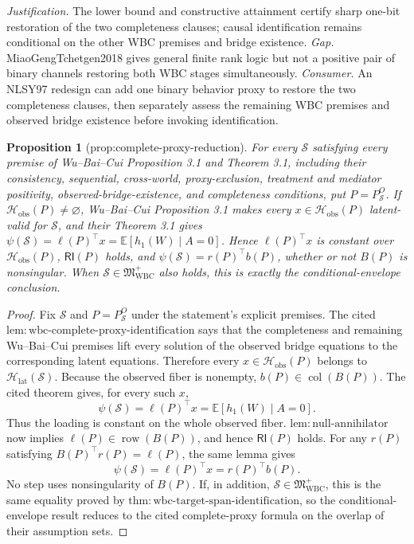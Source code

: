 \documentclass{article}
\newtheorem{proposition}{Proposition}
\begin{document}
\par\smallskip\noindent \textit{Justification.} The lower bound and constructive attainment certify sharp one-bit restoration of the two completeness clauses; causal identification remains conditional on the other WBC premises and bridge existence. \textit{Gap.} MiaoGengTchetgen2018 gives general finite rank logic but not a positive pair of binary channels restoring both WBC stages simultaneously. \textit{Consumer.} An NLSY97 redesign can add one binary behavior proxy to restore the two completeness clauses, then separately assess the remaining WBC premises and observed bridge existence before invoking identification.

\begin{proposition}[prop:complete-proxy-reduction]\label{prop:complete-proxy-reduction}
For every \(\mathcal S\) satisfying every premise of Wu--Bai--Cui Proposition 3.1 and Theorem 3.1, including their consistency, sequential, cross-world, proxy-exclusion, treatment and mediator positivity, observed-bridge-existence, and completeness conditions, put \(P=P_{\mathcal S}^O\). If \(\mathcal H_{\mathrm{obs}}(P)\neq\varnothing\), Wu--Bai--Cui Proposition 3.1 makes every \(x\in\mathcal H_{\mathrm{obs}}(P)\) latent-valid for \(\mathcal S\), and their Theorem 3.1 gives \(\psi(\mathcal S)=\ell(P)^{\top}x=\mathbb E[h_1(W)\mid A=0]\). Hence \(\ell(P)^{\top}x\) is constant over \(\mathcal H_{\mathrm{obs}}(P)\), \(\mathsf{RI}(P)\) holds, and \(\psi(\mathcal S)=r(P)^{\top}b(P)\), whether or not \(B(P)\) is nonsingular. When \(\mathcal S\in\mathfrak M_{\mathrm{WBC}}^{+}\) also holds, this is exactly the conditional-envelope conclusion.
\end{proposition}
\begin{proof}
Fix \(\mathcal S\) and \(P=P_{\mathcal S}^O\) under the statement's
explicit premises.  The cited
\(\mathrm{lem{:}wbc\text{-}complete\text{-}proxy\text{-}identification}\) says
that the completeness and remaining Wu--Bai--Cui premises lift every solution of
the observed bridge equations to the corresponding latent equations.  Therefore
every \(x\in\mathcal H_{\mathrm{obs}}(P)\) belongs to
\(\mathcal H_{\mathrm{lat}}(\mathcal S)\).  Because the observed fiber is
nonempty, \(b(P)\in\operatorname{col}(B(P))\).  The cited theorem gives, for
every such \(x\),
\[
 \psi(\mathcal S)=\ell(P)^\top x
 =\mathbb E[h_1(W)\mid A=0].
\]
Thus the loading is constant on the whole observed fiber.
\(\mathrm{lem{:}null\text{-}annihilator}\) now implies
\(\ell(P)\in\operatorname{row}(B(P))\), and hence
\(\mathsf{RI}(P)\) holds.  For any \(r(P)\) satisfying
\(B(P)^\top r(P)=\ell(P)\), the same lemma gives
\[
 \psi(\mathcal S)=\ell(P)^\top x=r(P)^\top b(P).
\]
No step uses nonsingularity of \(B(P)\).  If, in addition,
\(\mathcal S\in\mathfrak M_{\mathrm{WBC}}^+\), this is the same equality proved
by \(\mathrm{thm{:}wbc\text{-}target\text{-}span\text{-}identification}\), so
the conditional-envelope result reduces to the cited complete-proxy formula on
the overlap of their assumption sets.
\end{proof}
\end{document}
